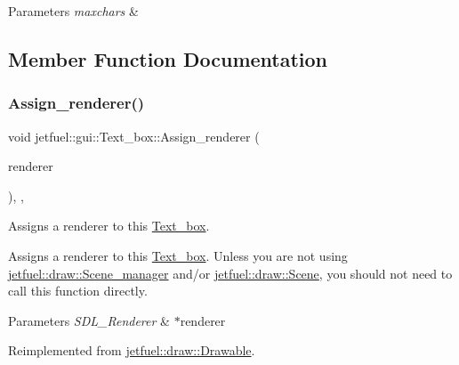 \begin{DoxyParams}{Parameters}
{\em maxchars} & \\
\hline
\end{DoxyParams}


\subsection{Member Function Documentation}
\mbox{\label{classjetfuel_1_1gui_1_1Text__box_ad387deeeb41a04ab4fc34a48ba5ed910}} 
\subsubsection{\texorpdfstring{Assign\+\_\+renderer()}{Assign\_renderer()}}
{\footnotesize\ttfamily void jetfuel\+::gui\+::\+Text\+\_\+box\+::\+Assign\+\_\+renderer (\begin{DoxyParamCaption}\item[{S\+D\+L\+\_\+\+Renderer $\ast$}]{renderer }\end{DoxyParamCaption})\hspace{0.3cm}{\ttfamily [inline]}, {\ttfamily [override]}, {\ttfamily [virtual]}}



Assigns a renderer to this \hyperlink{classjetfuel_1_1gui_1_1Text__box}{Text\+\_\+box}. 

Assigns a renderer to this \hyperlink{classjetfuel_1_1gui_1_1Text__box}{Text\+\_\+box}. Unless you are not using \hyperlink{classjetfuel_1_1draw_1_1Scene__manager}{jetfuel\+::draw\+::\+Scene\+\_\+manager} and/or \hyperlink{classjetfuel_1_1draw_1_1Scene}{jetfuel\+::draw\+::\+Scene}, you should not need to call this function directly.


\begin{DoxyParams}{Parameters}
{\em S\+D\+L\+\_\+\+Renderer} & $\ast$renderer \\
\hline
\end{DoxyParams}


Reimplemented from \hyperlink{classjetfuel_1_1draw_1_1Drawable_a0d7257f197d6ffcdd89c3a99c93d1400}{jetfuel\+::draw\+::\+Drawable}.

\mbox{\label{classjetfuel_1_1gui_1_1Text__box_a088d62b01be4747ea2e7a6218516e036}} 
